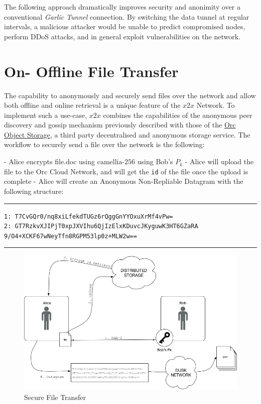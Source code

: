 The following approach dramatically improves security and anonimity over
a conventional \emph{Garlic Tunnel} connection. By switching the data
tunnel at regular intervals, a malicious attacker would be unable to
predict compromised nodes, perform DDoS attacks, and in general exploit
vulnerabilities on the network.

\section{On- Offline File Transfer}

The capability to anonymously and securely send files over the network
and allow both offline and online retrieval is a unique feature of the
\(x2x\) Network. To implement such a use-case, \(x2x\) combines the
capabilities of the anonymous peer discovery and gossip mechanism
previously described with those of the \href{https://orc.network/}{Orc
Object Storage}, a third party decentralised and anonymous storage
service. The workflow to securely send a file over the network is the
following:

- Alice encrypts file.doc using \(\textrm{camellia-256}\) using Bob's
\(P_k\) - Alice will upload the file to the Orc Cloud Network, and will
get the \texttt{id} of the file once the upload is complete - Alice will
create an Anonymous Non-Repliable Datagram with the following structure:

\begin{center}\rule{0.5\linewidth}{\linethickness}\end{center}

\texttt{1:\ T7CvGQr0/nq8xiLfekdTUGz6rQggGnYYOxuXrMf4vPw=}\\
\texttt{2:\ GT7RzkvXJIPjT0xpJXVIhu6QjIzElxKDuvcJKyguwK3HT6GZaRA\\9/O4+XCKF67wNeyTfn8RGPM53lp0z+MLW2w==}

\begin{center}\rule{0.5\linewidth}{\linethickness}\end{center}

\begin{figure}
\includegraphics[scale=0.20]{orc}
\caption{Secure File Transfer}
\label{orc}
\end{figure}


